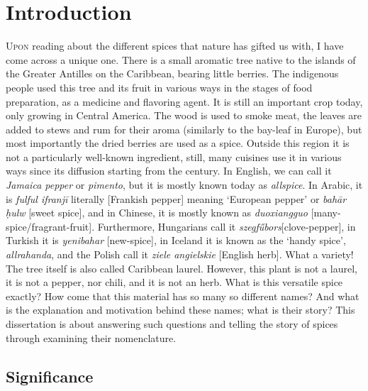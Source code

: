 \chapter{Introduction}
\label{ch:introduction}

\lettrine[lines=\iniciale]{\textcolor{\accentcolor}{U}}{pon} reading about the different spices that nature has gifted us with, I have come across a unique one. There is a small aromatic tree native to the islands of the Greater Antilles on the Caribbean, bearing little berries. The indigenous people used this tree and its fruit in various ways in the stages of food preparation, as a medicine and flavoring agent. It is still an important crop today, only growing in Central America. The wood is used to smoke meat, the leaves are added to stews and rum for their aroma (similarly to the bay-leaf in Europe), but most importantly the dried berries are used as a spice. Outside this region it is not a particularly well-known ingredient, still, many cuisines use it in various ways since its diffusion starting from the  century. In English, we can call it \textit{Jamaica pepper} or \textit{pimento}, but it is mostly known today as \textit{allspice}. In Arabic, it is \textit{fulful ifranjī} literally [Frankish pepper] meaning `European pepper' or \textit{bah\={a}r ḥulw} [sweet spice], and in Chinese, it is mostly known as \textit{duoxiangguo} [many-spice/fragrant-fruit]. Furthermore, Hungarians call it \textit{szegfűbors}[clove-pepper], in Turkish it is \textit{yenibahar} [new-spice], in Iceland it is known as the `handy spice', \textit{allrahanda}, and the Polish call it \textit{ziele angielskie} [English herb]. What a variety! The tree itself is also called Caribbean laurel. However, this plant is not a laurel, it is not a pepper, nor chili, and it is not an herb. What is this versatile spice exactly? How come that this material has so many so different names? And what is the explanation and motivation behind these names; what is their story? This dissertation is about answering such questions and telling the story of spices through examining their nomenclature.

\section{Significance}

